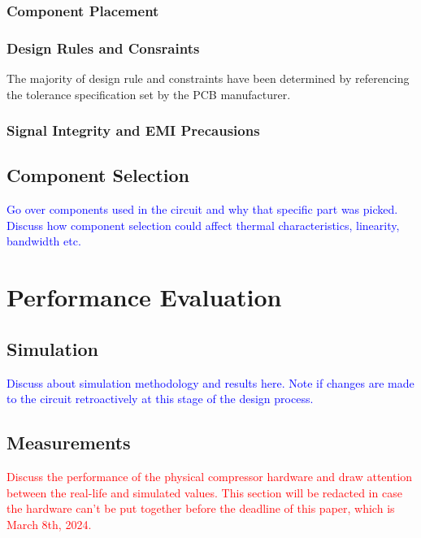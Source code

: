 \documentclass[10pt]{article}
\begin{document}
\begin{multicols*}{2}
                \subsubsection{Component Placement}

                \subsubsection{Design Rules and Consraints}
                    The majority of design rule and constraints have been determined by referencing the tolerance specification set by the PCB manufacturer. 

                \subsubsection{Signal Integrity and EMI Precausions}

            \subsection{Component Selection}
                \textcolor{blue}{Go over components used in the circuit and why that specific part was picked. Discuss how component selection could affect thermal characteristics, linearity, bandwidth etc.}
        
        \section{Performance Evaluation}

            \subsection{Simulation}
                \textcolor{blue}{Discuss about simulation methodology and results here. Note if changes are made to the circuit retroactively at this stage of the design process.}

            \subsection{Measurements}
                \textcolor{red}{Discuss the performance of the physical compressor hardware and draw attention between the real-life and simulated values. This section will be redacted in case the hardware can't be put together before the deadline of this paper, which is March 8th, 2024.}
        

\end{multicols*}
\end{document}
